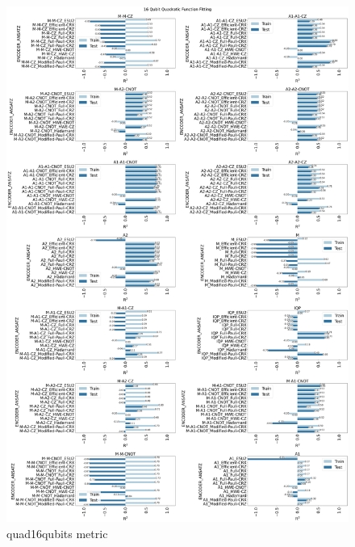 \documentclass[journal=jacsat,manuscript=article]{achemso}
\begin{document}
\begin{figure}[H]
	\centering
	\includegraphics[width=0.8\linewidth]{images/16qubit_Quadratic_funcfit_R2.png}
	\caption{quad16qubits metric}
	\label{fig:quad16qubits_metric}
\end{figure}
\end{document}
